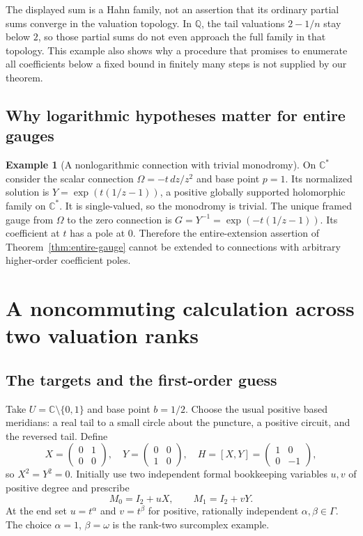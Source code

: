 \documentclass[11pt,letterpaper]{article}
\numberwithin{equation}{section}
\theoremstyle{definition}
\newtheorem{example}[theorem]{Example}
\theoremstyle{remark}
\newcommand{\C}{\mathbb C}
\newcommand{\Q}{\mathbb Q}
\begin{document}
The displayed sum is a Hahn family, not an assertion that its ordinary
partial sums converge in the valuation topology. In $\Q$, the tail
valuations $2-1/n$ stay below $2$, so those partial sums do not even approach
the full family in that topology. This example also shows why a procedure
that promises to enumerate all coefficients below a fixed bound in finitely
many steps is not supplied by our theorem.

\subsection{Why logarithmic hypotheses matter for entire gauges}
\begin{example}[A nonlogarithmic connection with trivial monodromy]
On $\C^*$ consider the scalar connection
$\Omega=-t\,dz/z^2$ and base point $p=1$. Its normalized solution is
$Y=\exp(t(1/z-1))$, a positive globally supported holomorphic family on
$\C^*$. It is single-valued, so the monodromy is trivial. The unique framed
gauge from $\Omega$ to the zero connection is
$G=Y^{-1}=\exp(-t(1/z-1))$. Its coefficient at $t$ has a pole at $0$.
Therefore the entire-extension assertion of
Theorem~\ref{thm:entire-gauge} cannot be extended to connections with
arbitrary higher-order coefficient poles.
\end{example}

\section{A noncommuting calculation across two valuation ranks}
\label{sec:example}

\subsection{The targets and the first-order guess}
Take $U=\C\setminus\{0,1\}$ and base point $b=1/2$. Choose the usual
positive based meridians: a real tail to a small circle about the puncture,
a positive circuit, and the reversed tail. Define
\[
 X=\begin{pmatrix}0&1\\0&0\end{pmatrix},\quad
 Y=\begin{pmatrix}0&0\\1&0\end{pmatrix},\quad
 H=[X,Y]=\begin{pmatrix}1&0\\0&-1\end{pmatrix},
\]
so $X^2=Y^2=0$. Initially use two independent formal bookkeeping variables
$u,v$ of positive degree and prescribe
\begin{equation}\label{eq:two-targets}
 M_0=I_2+uX,\qquad M_1=I_2+vY.
\end{equation}
At the end set $u=t^\alpha$ and $v=t^\beta$ for positive, rationally
independent $\alpha,\beta\in\Gamma$. The choice $\alpha=1$, $\beta=\omega$
is the rank-two surcomplex example.
\end{document}
